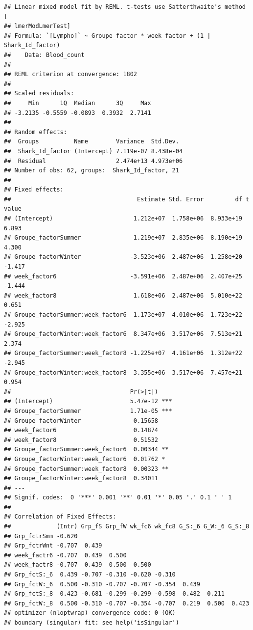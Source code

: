 \documentclass[
]{article}
\begin{document}
\begin{verbatim}
## Linear mixed model fit by REML. t-tests use Satterthwaite's method [
## lmerModLmerTest]
## Formula: `[Lympho]` ~ Groupe_factor * week_factor + (1 | Shark_Id_factor)
##    Data: Blood_count
## 
## REML criterion at convergence: 1802
## 
## Scaled residuals: 
##     Min      1Q  Median      3Q     Max 
## -3.2135 -0.5559 -0.0893  0.3932  2.7141 
## 
## Random effects:
##  Groups          Name        Variance  Std.Dev. 
##  Shark_Id_factor (Intercept) 7.119e-07 8.438e-04
##  Residual                    2.474e+13 4.973e+06
## Number of obs: 62, groups:  Shark_Id_factor, 21
## 
## Fixed effects:
##                                    Estimate Std. Error         df t value
## (Intercept)                       1.212e+07  1.758e+06  8.933e+19   6.893
## Groupe_factorSummer               1.219e+07  2.835e+06  8.190e+19   4.300
## Groupe_factorWinter              -3.523e+06  2.487e+06  1.258e+20  -1.417
## week_factor6                     -3.591e+06  2.487e+06  2.407e+25  -1.444
## week_factor8                      1.618e+06  2.487e+06  5.010e+22   0.651
## Groupe_factorSummer:week_factor6 -1.173e+07  4.010e+06  1.723e+22  -2.925
## Groupe_factorWinter:week_factor6  8.347e+06  3.517e+06  7.513e+21   2.374
## Groupe_factorSummer:week_factor8 -1.225e+07  4.161e+06  1.312e+22  -2.945
## Groupe_factorWinter:week_factor8  3.355e+06  3.517e+06  7.457e+21   0.954
##                                  Pr(>|t|)    
## (Intercept)                      5.47e-12 ***
## Groupe_factorSummer              1.71e-05 ***
## Groupe_factorWinter               0.15658    
## week_factor6                      0.14874    
## week_factor8                      0.51532    
## Groupe_factorSummer:week_factor6  0.00344 ** 
## Groupe_factorWinter:week_factor6  0.01762 *  
## Groupe_factorSummer:week_factor8  0.00323 ** 
## Groupe_factorWinter:week_factor8  0.34011    
## ---
## Signif. codes:  0 '***' 0.001 '**' 0.01 '*' 0.05 '.' 0.1 ' ' 1
## 
## Correlation of Fixed Effects:
##             (Intr) Grp_fS Grp_fW wk_fc6 wk_fc8 G_S:_6 G_W:_6 G_S:_8
## Grp_fctrSmm -0.620                                                 
## Grp_fctrWnt -0.707  0.439                                          
## week_factr6 -0.707  0.439  0.500                                   
## week_factr8 -0.707  0.439  0.500  0.500                            
## Grp_fctS:_6  0.439 -0.707 -0.310 -0.620 -0.310                     
## Grp_fctW:_6  0.500 -0.310 -0.707 -0.707 -0.354  0.439              
## Grp_fctS:_8  0.423 -0.681 -0.299 -0.299 -0.598  0.482  0.211       
## Grp_fctW:_8  0.500 -0.310 -0.707 -0.354 -0.707  0.219  0.500  0.423
## optimizer (nloptwrap) convergence code: 0 (OK)
## boundary (singular) fit: see help('isSingular')
\end{verbatim}
\end{document}
